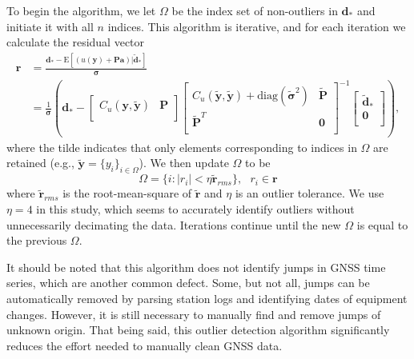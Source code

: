 \documentclass[10pt,letter]{article}
\begin{document}
To begin the algorithm, we let $\Omega$ be the index set of non-outliers in $\bm{d}_*$ and initiate it with all $n$ indices. This algorithm is iterative, and for each iteration we calculate the residual vector
\begin{align}\label{eq:Residual}
\bm{r} &= \frac{\bm{d}_* - \mathrm{E}\left[(u(\bm{y}) + \bm{P}\bm{a})|\tilde{\bm{d}}_* \right]}{\bm{\sigma}} \\
       &= \frac{1}{\bm{\sigma}}\left(\bm{d}_*  - 
          \left[\begin{array}{cc}
                C_u(\bm{y},\tilde{\bm{y}}) & \bm{P} \\
                \end{array}\right]
          \left[\begin{array}{cc}
                C_u(\tilde{\bm{y}},\tilde{\bm{y}}) + \mathrm{diag}(\tilde{\bm{\sigma}}^2) & \tilde{\bm{P}} \\
                \tilde{\bm{P}}^T  & \bm{0} \\
                \end{array}\right]^{-1}
          \left[\begin{array}{c}
                \tilde{\bm{d}}_* \\
                \bm{0} \\
                \end{array}\right]\right),
\end{align}
where the tilde indicates that only elements corresponding to indices in $\Omega$ are retained (e.g., $\tilde{\bm{y}} = \{y_i\}_{i\in\Omega}$). We then update $\Omega$ to be
\begin{equation}\label{eq:Update}
\Omega = \{i : |r_i| < \eta \tilde{\bm{r}}_{rms}\}, \ \ \ r_i \in \bm{r}
\end{equation} 
where $\tilde{\bm{r}}_{rms}$ is the root-mean-square of $\tilde{\bm{r}}$ and $\eta$ is an outlier tolerance. We use $\eta=4$ in this study, which seems to accurately identify outliers without unnecessarily decimating the data. Iterations continue until the new $\Omega$ is equal to the previous $\Omega$. 

It should be noted that this algorithm does not identify jumps in GNSS time series, which are another common defect. Some, but not all, jumps can be automatically removed by parsing station logs and identifying dates of equipment changes. However, it is still necessary to manually find and remove jumps of unknown origin. That being said, this outlier detection algorithm significantly reduces the effort needed to manually clean GNSS data.       
\end{document}
